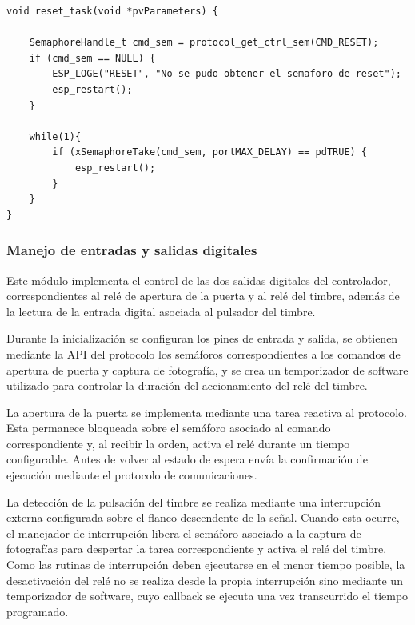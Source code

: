 \begin{minipage}{\linewidth}
\begin{lstlisting}[frame=single]
    void reset_task(void *pvParameters) {
    
    SemaphoreHandle_t cmd_sem = protocol_get_ctrl_sem(CMD_RESET);
    if (cmd_sem == NULL) {
        ESP_LOGE("RESET", "No se pudo obtener el semaforo de reset");
        esp_restart();
    }

    while(1){
        if (xSemaphoreTake(cmd_sem, portMAX_DELAY) == pdTRUE) {
            esp_restart();
        }                               
    }
}
\end{lstlisting}
\end{minipage}

\subsubsection{Manejo de entradas y salidas digitales}

Este módulo implementa el control de las dos salidas digitales del controlador, correspondientes al relé de apertura de la puerta y al relé del timbre, además de la lectura de la entrada digital asociada al pulsador del timbre.

Durante la inicialización se configuran los pines de entrada y salida, se obtienen mediante la API del protocolo los semáforos correspondientes a los comandos de apertura de puerta y captura de fotografía, y se crea un temporizador de software utilizado para controlar la duración del accionamiento del relé del timbre.

La apertura de la puerta se implementa mediante una tarea reactiva al protocolo. Esta permanece bloqueada sobre el semáforo asociado al comando correspondiente y, al recibir la orden, activa el relé durante un tiempo configurable. Antes de volver al estado de espera envía la confirmación de ejecución mediante el protocolo de comunicaciones.

La detección de la pulsación del timbre se realiza mediante una interrupción externa configurada sobre el flanco descendente de la señal. Cuando esta ocurre, el manejador de interrupción libera el semáforo asociado a la captura de fotografías para despertar la tarea correspondiente y activa el relé del timbre. Como las rutinas de interrupción deben ejecutarse en el menor tiempo posible, la desactivación del relé no se realiza desde la propia interrupción sino mediante un temporizador de software, cuyo callback se ejecuta una vez transcurrido el tiempo programado.

